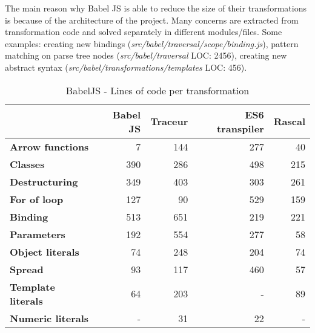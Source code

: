 The main reason why Babel JS is able to reduce the size of their transformations is because of the architecture of the project. Many concerns are extracted from transformation code and solved separately in different modules/files. Some examples: creating new bindings (\textit{src/babel/traversal/scope/binding.js}), pattern matching on parse tree nodes (\textit{src/babel/traversal} LOC: 2456), creating new abstract syntax (\textit{src/babel/transformations/templates} LOC: 456). 

\begin{table}[h!]
\centering
\caption{BabelJS - Lines of code per transformation} \label{tab:loc-feature}
\begin{tabular}{@{}lrrrr@{}}
\toprule
                           & \textbf{Babel JS} & \textbf{Traceur} & \textbf{ES6 transpiler} & \textbf{Rascal} \\ \midrule
\textbf{Arrow functions}   & 7                 & 144              & 277\footnotemark[1]     & 40 \\
\textbf{Classes}           & 390               & 286              & 498                     & 215 \\
\textbf{Destructuring}     & 349               & 403              & 303                     & 261 \\
\textbf{For of loop}       & 127               & 90               & 529                     & 159 \\
\textbf{Binding}           & 513               & 651              & 219                     & 221 \\
\textbf{Parameters}        & 192               & 554              & 277\footnotemark[1]     & 58 \\
\textbf{Object literals}   & 74                & 248              & 204                     & 74 \\
\textbf{Spread}            & 93                & 117              & 460                     & 57 \\
\textbf{Template literals} & 64                & 203              & -\footnotemark          & 89 \\
\textbf{Numeric literals}  & -                 & 31               & 22                      & - \\ \bottomrule
\end{tabular}
\end{table}

